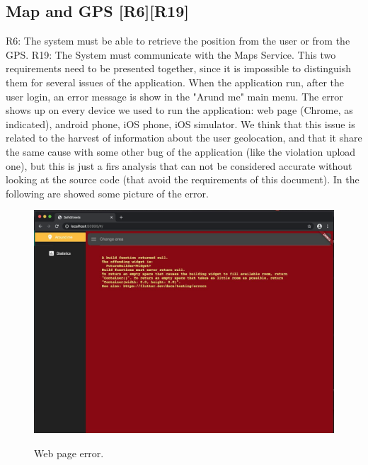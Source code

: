 \documentclass[../ATD.tex]{subfiles}
\begin{document}
    \subsection{Map and GPS [R6][R19]}\label{subsec:map-and-gps}
    R6: The system must be able to retrieve the position from the user or from the GPS.
    \newline
    R19: The System must communicate with the Maps Service.
    \newline
    This two requirements need to be presented together, since it is impossible to distinguish them for several issues of the application.
    \newline
    When the application run, after the user login, an error message is show in the "Arund me" main menu.
    The error shows up on every device we used to run the application: web page (Chrome, as indicated), android phone, iOS phone, iOS simulator.
    We think that this issue is related to the harvest of information about the user geolocation, and that it share the same cause with some other bug of the application (like the violation upload one), but this is just a firs analysis that can not be considered accurate without looking at the source code (that avoid the requirements of this document).
    In the following are showed some picture of the error.
    \newline
    \begin{figure}[H]
        \centering
        \includegraphics[scale = 0.4]{assets/web_page_error.png}\\
        \caption[Web page error]{Web page error.}
    \end{figure}
\end{document}
